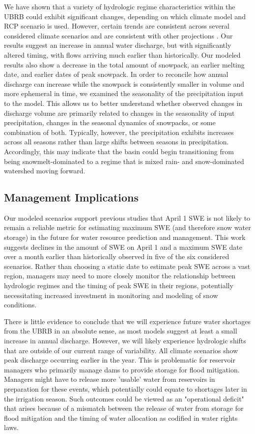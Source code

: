 \documentclass[11pt,letterpaper]{article}
\begin{document}
We have shown that a variety of hydrologic regime characteristics within the UBRB could exhibit significant changes, depending on which climate model and RCP scenario is used. However, certain trends are consistent across several considered climate scenarios and are consistent with other projections \citep{Adam:2009ie,Inouye:2014ws,Gergel:2017vj}. Our results suggest an increase in annual water discharge, but with significantly altered timing, with flows arriving much earlier than historically. Our modeled results also show a decrease in the total amount of snowpack, an earlier melting date, and earlier dates of peak snowpack. In order to reconcile how annual discharge can increase while the snowpack is consistently smaller in volume and more ephemeral in time, we examined the seasonality of the precipitation input to the model. This allows us to better understand whether observed changes in discharge volume are primarily related to changes in the seasonality of input precipitation, changes in the seasonal dynamics of snowpacks, or some combination of both. Typically, however, the precipitation exhibits increases across all seasons rather than large shifts between seasons in precipitation. Accordingly, this may indicate that the basin could begin transitioning from being snowmelt-dominated to a regime that is mixed rain- and snow-dominated watershed moving forward.

\subsection{Management Implications}

Our modeled scenarios support previous studies \citep{Pederson:2011ep,Klos:2014jra} that April 1 SWE is not likely to remain a reliable metric for estimating maximum SWE (and therefore snow water storage) in the future for water resource prediction and management. This work suggests declines in the amount of SWE on April 1 and a maximum SWE date over a month earlier than historically observed in five of the six considered scenarios. Rather than choosing a static date to estimate peak SWE across a vast region, managers may need to more closely monitor the relationship between hydrologic regimes and the timing of peak SWE in their regions, potentially necessitating increased investment in monitoring and modeling of snow conditions.

There is little evidence to conclude that we will experience future water shortages from the UBRB in an absolute sense, as most models suggest at least a small increase in annual discharge. However, we will likely experience hydrologic shifts that are outside of our current range of variability. All climate scenarios show peak discharge occurring earlier in the year. This is problematic for reservoir managers who primarily manage dams to provide storage for flood mitigation. Managers might have to release more 'usable' water from reservoirs in preparation for these events, which potentially could equate to shortages later in the irrigation season. Such outcomes could be viewed as an "operational deficit" that arises because of a mismatch between the release of water from storage for flood mitigation and the timing of water allocation as codified in water rights laws.
\end{document}
